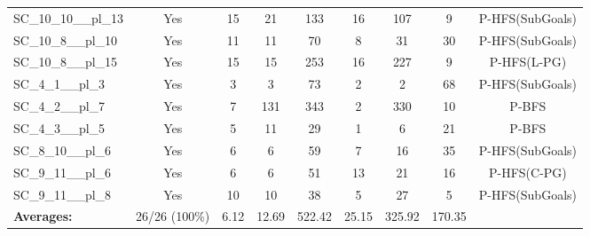 \documentclass{article}
\begin{document}
\begin{tabular}{lcccccccc}
SC\_10\_10\_\_pl\_13 & Yes & 15 & 21 & 133 & 16 & 107 & 9 & P-HFS(SubGoals) \\
SC\_10\_8\_\_pl\_10 & Yes & 11 & 11 & 70 & 8 & 31 & 30 & P-HFS(SubGoals) \\
SC\_10\_8\_\_pl\_15 & Yes & 15 & 15 & 253 & 16 & 227 & 9 & P-HFS(L-PG) \\
SC\_4\_1\_\_pl\_3 & Yes & 3 & 3 & 73 & 2 & 2 & 68 & P-HFS(SubGoals) \\
SC\_4\_2\_\_pl\_7 & Yes & 7 & 131 & 343 & 2 & 330 & 10 & P-BFS \\
SC\_4\_3\_\_pl\_5 & Yes & 5 & 11 & 29 & 1 & 6 & 21 & P-BFS \\
SC\_8\_10\_\_pl\_6 & Yes & 6 & 6 & 59 & 7 & 16 & 35 & P-HFS(SubGoals) \\
SC\_9\_11\_\_pl\_6 & Yes & 6 & 6 & 51 & 13 & 21 & 16 & P-HFS(C-PG) \\
SC\_9\_11\_\_pl\_8 & Yes & 10 & 10 & 38 & 5 & 27 & 5 & P-HFS(SubGoals) \\
\textbf{Averages:} & 26/26 (100\%) & 6.12 & 12.69 & 522.42 & 25.15 & 325.92 & 170.35 & \\
\bottomrule
\end{tabular}
\\[0.7cm]
\end{document}
